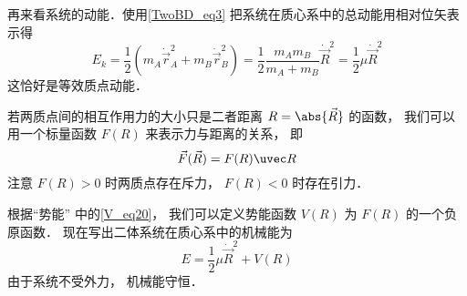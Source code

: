 再来看系统的动能．使用\autoref{TwoBD_eq3} 把系统在质心系中的总动能用相对位矢表示得
\begin{equation}
E_k = \frac 12 (m_A \dot{\vec r}_A^2 + m_B \dot{\vec r}_B^2) = \frac 12 \frac{m_A m_B}{m_A + m_B} \dot{\vec  R}^2 = \frac 12 \mu \dot{\vec  R}^2
\end{equation}
这恰好是等效质点动能．

若两质点间的相互作用力的大小只是二者距离 $R = \abs{\vec R}$ 的函数， 我们可以用一个标量函数 $F(R)$ 来表示力与距离的关系， 即
\begin{equation}
\vec F(\vec R) = F(R) \uvec R
\end{equation}
注意 $F(R)>0$ 时两质点存在斥力， $F(R)<0$ 时存在引力．

根据“势能” 中的\autoref{V_eq20}， 我们可以定义势能函数 $V(R)$ 为 $F(R)$ 的一个负原函数． 现在写出二体系统在质心系中的机械能为
\begin{equation}
E = \frac 12 \mu \dot{\vec  R}^2 + V(R)
\end{equation}
由于系统不受外力， 机械能守恒．